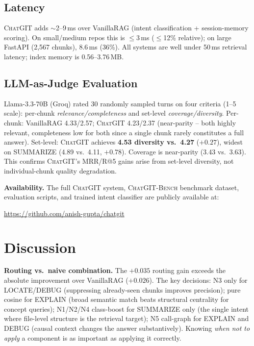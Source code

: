 \documentclass[conference]{IEEEtran}
\newcommand{\chatgit}{\textsc{ChatGIT}\xspace}
\newcommand{\conv}{\textsc{ChatGIT-Bench}\xspace}
\begin{document}
\subsection{Latency}

\chatgit adds ${\sim}$2--9\,ms over VanillaRAG (intent classification +
session-memory scoring). On small/medium repos this is $\leq$3\,ms
($\leq$12\% relative); on large FastAPI (2,567 chunks), 8.6\,ms (36\%).
All systems are well under 50\,ms retrieval latency; index memory is
0.56--3.76\,MB.

\subsection{LLM-as-Judge Evaluation}

Llama-3.3-70B (Groq) rated 30 randomly sampled turns on four criteria
(1--5 scale): per-chunk \emph{relevance/completeness} and set-level
\emph{coverage/diversity}. Per-chunk: VanillaRAG 4.33/2.57;
\chatgit 4.23/2.37 (near-parity -- both highly relevant, completeness
low for both since a single chunk rarely constitutes a full answer).
Set-level: \chatgit achieves \textbf{4.53 diversity vs.\ 4.27}
($+0.27$), widest on SUMMARIZE (4.89 vs.\ 4.11, $+0.78$).
Coverage is near-parity (3.43 vs.\ 3.63). This confirms \chatgit's
MRR/R@5 gains arise from set-level diversity, not individual-chunk
quality degradation.

\smallskip
\noindent\textbf{Availability.}
The full \chatgit system, \conv benchmark dataset, evaluation scripts,
and trained intent classifier are publicly available at:
\begin{center}
\url{https://github.com/anish-gupta/chatgit}
\end{center}

\section{Discussion}

\textbf{Routing vs.\ naive combination.} The $+0.035$ routing gain
exceeds the absolute improvement over VanillaRAG ($+0.026$). The key
decisions: N3 only for LOCATE/DEBUG (suppressing already-seen chunks
improves precision); pure cosine for EXPLAIN (broad semantic match
beats structural centrality for concept queries); N1/N2/N4 class-boost
for SUMMARIZE only (the single intent where file-level structure is the
retrieval target); N5 call-graph for EXPLAIN and DEBUG (causal context
changes the answer substantively). Knowing \emph{when not to apply}
a component is as important as applying it correctly.
\end{document}
